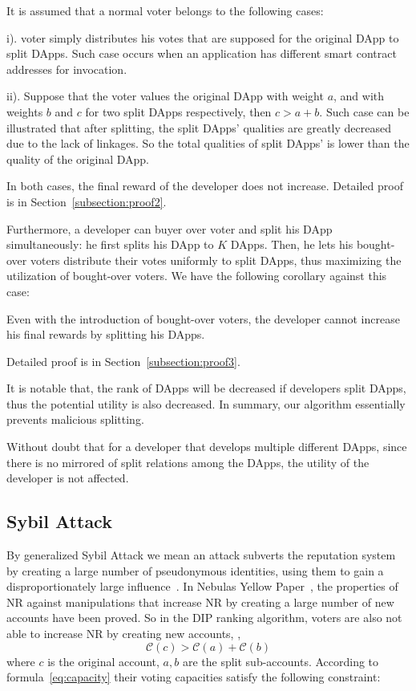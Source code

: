 It is assumed that a normal voter belongs to the following cases:
\begin{inparaenum}
\item[i).] voter simply distributes his votes that are supposed for the original DApp to split DApps. Such case occurs when an application has different smart contract addresses for invocation.
\item[ii).] Suppose that the voter values the original DApp with weight $a$, and with weights $b$ and $c$ for two split DApps respectively, then $c>a+b$. Such case can be illustrated that after splitting, the split DApps' qualities are greatly decreased due to the lack of linkages. So the total qualities of split DApps' is lower than the quality of the original DApp.
 \end{inparaenum}

  In both cases, the final reward of the developer does not increase. Detailed
  proof is in Section~\ref{subsection:proof2}.

Furthermore, a developer can buyer over voter and split his DApp simultaneously: he first splits his DApp to $K$ DApps. Then, he lets his bought-over voters distribute their votes uniformly to split DApps, thus  maximizing the utilization of  bought-over  voters. We have the following corollary against this case:

\begin{corollary}
	\label{c1}
	Even with the introduction of bought-over voters, the developer cannot increase his final rewards by splitting his DApps.
\end{corollary}

Detailed proof is in Section~\ref{subsection:proof3}.

It is notable that, the rank of DApps will be decreased if developers split DApps, thus the potential utility is also decreased. In summary, our algorithm essentially prevents malicious splitting.

Without doubt that for a developer that develops multiple different  DApps,
since there is no mirrored of split relations among the DApps, the utility of
the developer is not affected.

\subsection{Sybil Attack}
\noindent By generalized Sybil Attack we mean an attack subverts the reputation system by creating a large number of pseudonymous identities, using them to gain a disproportionately large influence~\cite{quercia2010sybil}. In Nebulas Yellow Paper~\cite{Nebulasyellowpaper}, the properties of NR against manipulations that increase NR by creating a large number of new accounts have been proved. So in the DIP ranking algorithm, voters are also not able to increase NR by creating new accounts, \ie,
$$\mathcal{C}(c)>\mathcal{C}(a)+\mathcal{C}(b)$$
where $c$ is the original account, $a,b$ are the split sub-accounts. According to formula~\ref{eq:capacity} their voting capacities satisfy the following constraint:

